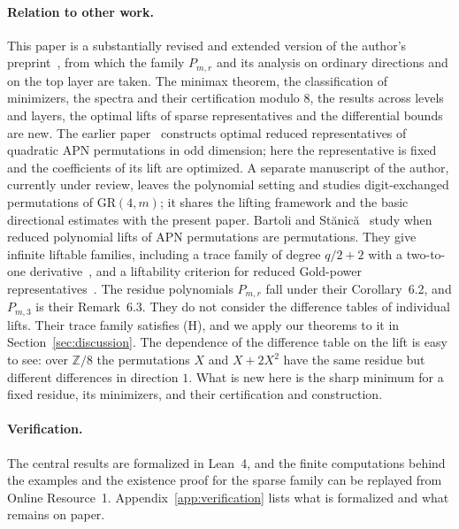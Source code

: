 \documentclass[11pt]{article}
\theoremstyle{definition}
\theoremstyle{remark}
\newcommand{\Z}{\mathbb{Z}}
\newcommand{\GR}{\mathrm{GR}}
\begin{document}
\paragraph{Relation to other work.}
This paper is a substantially revised and extended version of the author's preprint~\cite{Fukui2}, from which the
family $P_{m,r}$ and its analysis on ordinary directions and on the top layer are taken. The minimax theorem, the
classification of minimizers, the spectra and their certification modulo $8$, the results across levels and layers, the
optimal lifts of sparse representatives and the differential bounds are new. The earlier paper~\cite{Fukui1} constructs
optimal reduced representatives of quadratic APN permutations in odd dimension; here the representative is fixed and the
coefficients of its lift are optimized. A separate manuscript of the author, currently under review, leaves the
polynomial setting and studies digit-exchanged permutations of $\GR(4,m)$; it shares the lifting framework and the
basic directional estimates with the present paper. Bartoli and Stănică~\cite{BS} study when reduced polynomial lifts of
APN permutations are permutations. They give infinite liftable families, including a trace family of degree $q/2+2$
with a two-to-one derivative~\cite[Thm.~2.4]{BS}, and a liftability criterion for reduced Gold-power
representatives~\cite[Thm.~6.1, Cor.~6.2]{BS}. The residue polynomials $P_{m,r}$ fall under their Corollary~6.2, and
$P_{m,3}$ is their Remark~6.3. They do not consider the difference tables of individual lifts. Their trace family
satisfies (H), and we apply our theorems to it in Section~\ref{sec:discussion}. The dependence of the difference table on the
lift is easy to see: over $\Z/8$ the permutations $X$ and $X+2X^2$ have the same residue but different differences in
direction $1$. What is new here is the sharp minimum for a fixed residue, its minimizers, and their certification and
construction.

\paragraph{Verification.}
The central results are formalized in Lean~4, and the finite computations behind the examples and the existence proof
for the sparse family can be replayed from Online Resource~1. Appendix~\ref{app:verification}
lists what is formalized and what remains on paper.
\end{document}

